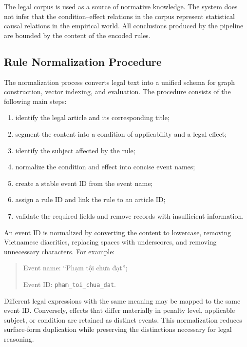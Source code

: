 The legal corpus is used as a source of normative knowledge. The system does
not infer that the condition--effect relations in the corpus represent
statistical causal relations in the empirical world. All conclusions produced
by the pipeline are bounded by the content of the encoded rules.

\subsection{Rule Normalization Procedure}

The normalization process converts legal text into a unified schema for graph
construction, vector indexing, and evaluation. The procedure consists of the
following main steps:

\begin{enumerate}
    \item identify the legal article and its corresponding title;

    \item segment the content into a condition of applicability and a legal
    effect;

    \item identify the subject affected by the rule;

    \item normalize the condition and effect into concise event names;

    \item create a stable event ID from the event name;

    \item assign a rule ID and link the rule to an article ID;

    \item validate the required fields and remove records with insufficient
    information.
\end{enumerate}

An event ID is normalized by converting the content to lowercase, removing
Vietnamese diacritics, replacing spaces with underscores, and removing
unnecessary characters. For example:

\begin{quote}
Event name: ``Phạm tội chưa đạt'';

Event ID: \texttt{pham\_toi\_chua\_dat}.
\end{quote}

Different legal expressions with the same meaning may be mapped to the same
event ID. Conversely, effects that differ materially in penalty level,
applicable subject, or condition are retained as distinct events. This
normalization reduces surface-form duplication while preserving the
distinctions necessary for legal reasoning.

